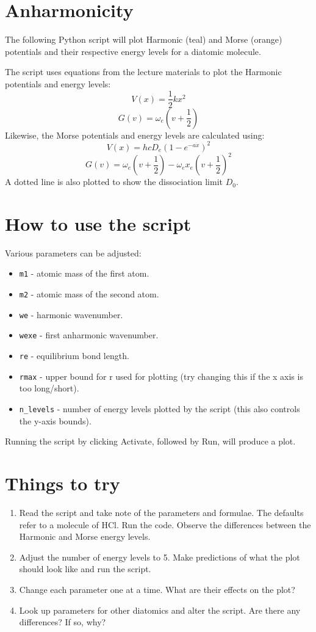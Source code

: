\documentclass{article}
\begin{document}
\section{Anharmonicity}

The following Python script will plot Harmonic (teal) and Morse (orange) potentials and their respective energy levels for a diatomic molecule. \par\medskip 
\noindent The script uses equations from the lecture materials to plot the Harmonic potentials and energy levels:
\[V(x) = \frac{1}{2} kx^2\]
\[G(v) = \omega_e(v+\frac{1}{2})\]
Likewise, the Morse potentials and energy levels are calculated using:
\[V(x) = hcD_e(1-e^{-ax})^2\]
\[G(v) = \omega_e(v+\frac{1}{2})-\omega_ex_e(v+\frac{1}{2})^2\]
A dotted line is also plotted to show the dissociation limit $D_0$.

\section{How to use the script}
Various parameters can be adjusted: 
\begin{itemize}
\item \texttt{m1} - atomic mass of the first atom.
\item \texttt{m2} - atomic mass of the second atom.
\item \texttt{we} - harmonic wavenumber.
\item \texttt{wexe} - first anharmonic wavenumber.
\item \texttt{re} - equilibrium bond length.
\item \texttt{rmax} - upper bound for r used for plotting (try changing this if the x axis is too long/short).
\item \texttt{n\_levels} - number of energy levels plotted by the script (this also controls the y-axis bounds).
\end{itemize}
Running the script by clicking Activate, followed by Run, will produce a plot.

\section{Things to try}
\begin{enumerate}
\item Read the script and take note of the parameters and formulae. The defaults refer to a molecule of HCl. Run the code. Observe the differences between the Harmonic and Morse energy levels.
\item Adjust the number of energy levels to 5. Make predictions of what the plot should look like and run the script.
\item Change each parameter one at a time. What are their effects on the plot?
\item Look up parameters for other diatomics and alter the script. Are there any differences? If so, why?
\end{enumerate}
\end{document}
